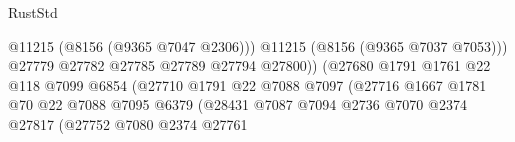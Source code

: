 \begin{lexlean}{RustStd}
\begin{coremodule}
{\begin{coremodule}
{{{{{{{{{{{{{{{{{{{{{{{{{{{{{{{{{{                                                            @11215
                                                            (@8156 (@9365 @7047 @2306)))
                                                          @11215
                                                          (@8156 (@9365 @7037 @7053)))
                                                        @27779
                                                        @27782
                                                        @27785
                                                        @27789
                                                        @27794
                                                        @27800))
                                                    (@27680
                                                      @1791
                                                      @1761
                                                      @22
                                                      @118
                                                      @7099
                                                      @6854
                                                      (@27710
                                                        @1791
                                                        @22
                                                        @7088
                                                        @7097
                                                        (@27716
                                                          @1667
                                                          @1781
                                                          @70
                                                          @22
                                                          @7088
                                                          @7095
                                                          @6379
                                                          (@28431
                                                            @7087
                                                            @7094
                                                            @2736
                                                            @7070
                                                            @2374
                                                            @27817
                                                            (@27752
                                                              @7080
                                                              @2374
                                                              @27761
}}}}}}}}}}}}}}}}}}}}}}}}}}}}}}}}}}
\end{coremodule}}
\end{coremodule}
\end{lexlean}
